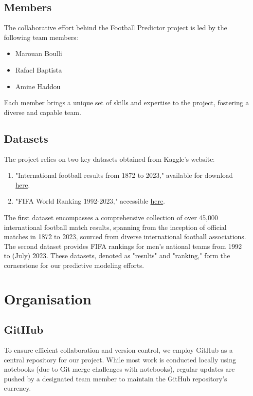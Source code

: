 \documentclass[a4paper,12pt]{article}
\begin{document}
\subsection{Members}

The collaborative effort behind the Football Predictor project is led by the following team members:
\begin{itemize}
    \item Marouan Boulli
    \item Rafael Baptista
    \item Amine Haddou
\end{itemize}
Each member brings a unique set of skills and expertise to the project, fostering a diverse and capable team.

\subsection{Datasets} 

The project relies on two key datasets obtained from Kaggle's website:
\begin{enumerate}
    \item "International football results from 1872 to 2023," available for download \href{https://www.kaggle.com/datasets/martj42/international-football-results-from-1872-to-2017}{here}.
    \item "FIFA World Ranking 1992-2023," accessible \href{https://www.kaggle.com/datasets/cashncarry/fifaworldranking}{here}.
\end{enumerate}
The first dataset encompasses a comprehensive collection of over 45,000 international football match results, spanning from the inception of official matches in 1872 to 2023, sourced from diverse international football associations. The second dataset provides FIFA rankings for men's national teams from 1992 to (July) 2023. These datasets, denoted as "results" and "ranking," form the cornerstone for our predictive modeling efforts.

\section{Organisation}

\subsection{GitHub} 

To ensure efficient collaboration and version control, we employ GitHub as a central repository for our project. While most work is conducted locally using notebooks (due to Git merge challenges with notebooks), regular updates are pushed by a designated team member to maintain the GitHub repository's currency.
\end{document}
